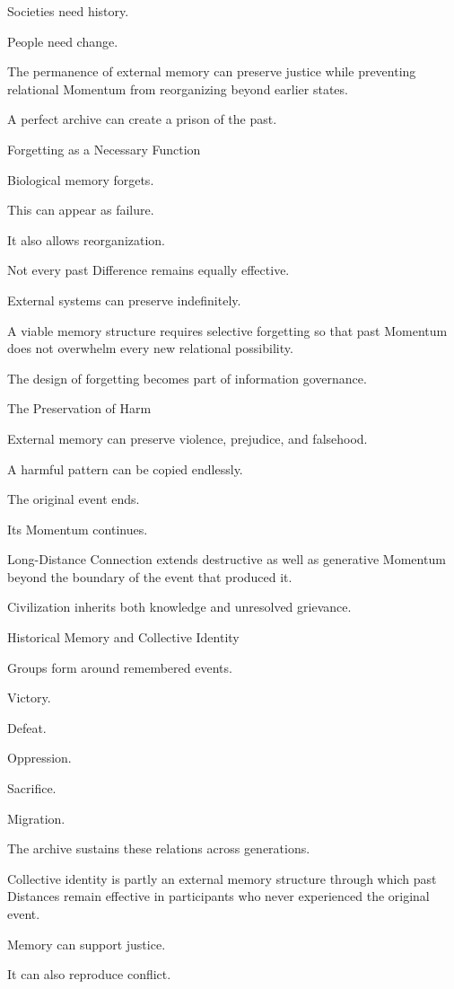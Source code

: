 Societies need history.

People need change.

The permanence of external memory can preserve justice while preventing relational Momentum from reorganizing beyond earlier states.

A perfect archive can create a prison of the past.

Forgetting as a Necessary Function

Biological memory forgets.

This can appear as failure.

It also allows reorganization.

Not every past Difference remains equally effective.

External systems can preserve indefinitely.

A viable memory structure requires selective forgetting so that past Momentum does not overwhelm every new relational possibility.

The design of forgetting becomes part of information governance.

The Preservation of Harm

External memory can preserve violence, prejudice, and falsehood.

A harmful pattern can be copied endlessly.

The original event ends.

Its Momentum continues.

Long-Distance Connection extends destructive as well as generative Momentum beyond the boundary of the event that produced it.

Civilization inherits both knowledge and unresolved grievance.

Historical Memory and Collective Identity

Groups form around remembered events.

Victory.

Defeat.

Oppression.

Sacrifice.

Migration.

The archive sustains these relations across generations.

Collective identity is partly an external memory structure through which past Distances remain effective in participants who never experienced the original event.

Memory can support justice.

It can also reproduce conflict.

